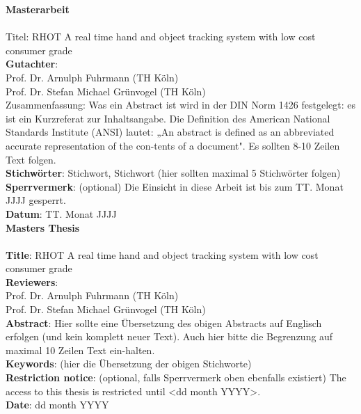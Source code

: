 \begin{titlepage}
\begin{center}
\end{center}
\newpage
\setcounter{page}{1}
\huge\textbf{Masterarbeit}\\\\
\large
Titel: RHOT A real time hand and object tracking system with low cost consumer grade\\
\textbf{Gutachter}:\\
	Prof. Dr. Arnulph Fuhrmann (TH Köln)\\
	Prof. Dr. Stefan Michael Grünvogel (TH Köln)\\
Zusammenfassung: Was ein Abstract ist wird in der DIN Norm 1426 festgelegt: es ist ein Kurzreferat zur Inhaltsangabe. Die Definition des American National Standards Institute (ANSI) lautet: „An abstract is defined as an abbreviated accurate representation of the con-tents of a document". Es sollten 8-10 Zeilen Text folgen.\\
\textbf{Stichwörter}: Stichwort, Stichwort (hier sollten maximal 5 Stichwörter folgen)\\
\textbf{Sperrvermerk}: (optional) Die Einsicht in diese Arbeit ist bis zum TT. Monat JJJJ gesperrt.\\
\textbf{Datum}: TT. Monat JJJJ\\
\newpage
\huge \textbf{Masters Thesis}\\\\
\large
\textbf{Title}: RHOT A real time hand and object tracking system with low cost consumer grade\\
\textbf{Reviewers}:\\
	Prof. Dr. Arnulph Fuhrmann (TH Köln)\\
	Prof. Dr. Stefan Michael Grünvogel (TH Köln)\\
\textbf{Abstract}: Hier sollte eine Übersetzung des obigen Abstracts auf Englisch erfolgen (und kein komplett neuer Text). Auch hier bitte die Begrenzung auf maximal 10 Zeilen Text ein-halten.\\
\textbf{Keywords}: (hier die Übersetzung der obigen Stichworte)\\
\textbf{Restriction notice}: (optional, falls Sperrvermerk oben ebenfalls existiert) The access to this thesis is restricted until <dd month YYYY>.\\
\textbf{Date}: dd month YYYY\\

\end{titlepage}
